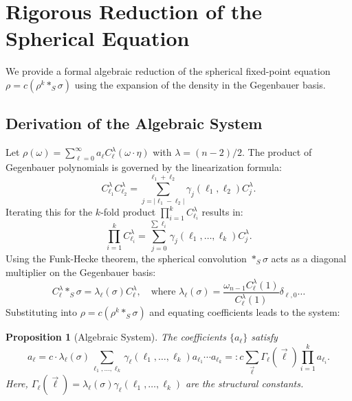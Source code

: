 \documentclass[12pt]{article}
\newtheorem{proposition}[theorem]{Proposition}
\begin{document}
\section{Rigorous Reduction of the Spherical Equation}

We provide a formal algebraic reduction of the spherical fixed-point equation
$\rho = c (\rho^k \ast_S \sigma)$ using the expansion of the density in the 
Gegenbauer basis.

\subsection{Derivation of the Algebraic System}
Let $\rho(\omega) = \sum_{\ell=0}^\infty a_\ell C_\ell^\lambda(\omega \cdot \eta)$ with $\lambda = (n-2)/2$.
The product of Gegenbauer polynomials is governed by the linearization formula:
\[
  C_{\ell_1}^\lambda C_{\ell_2}^\lambda = \sum_{j=|\ell_1-\ell_2|}^{\ell_1+\ell_2} \gamma_j(\ell_1, \ell_2) C_j^\lambda.
\]
Iterating this for the $k$-fold product $\prod_{i=1}^k C_{\ell_i}^\lambda$ results in:
\[
  \prod_{i=1}^k C_{\ell_i}^\lambda = \sum_{j=0}^{\sum \ell_i} \gamma_j(\ell_1, \dots, \ell_k) C_j^\lambda.
\]
Using the Funk-Hecke theorem, the spherical convolution $\ast_S \sigma$ acts as a diagonal multiplier on the Gegenbauer basis:
\[
  C_\ell^\lambda \ast_S \sigma = \lambda_\ell(\sigma) C_\ell^\lambda, \quad \text{where } \lambda_\ell(\sigma) = \frac{\omega_{n-1} C_\ell^\lambda(1)}{C_\ell^\lambda(1)} \delta_{\ell,0} \dots
\]
Substituting into $\rho = c (\rho^k \ast_S \sigma)$ and equating coefficients leads to the system:
\begin{proposition}[Algebraic System]
  The coefficients $\{a_\ell\}$ satisfy
  \[
    a_\ell = c \cdot \lambda_\ell(\sigma) \sum_{\ell_1, \dots, \ell_k} \gamma_\ell(\ell_1, \dots, \ell_k) a_{\ell_1} \cdots a_{\ell_k} =: c \sum_{\vec{\ell}} \Gamma_\ell(\vec{\ell}) \prod_{i=1}^k a_{\ell_i}.
  \]
  Here, $\Gamma_\ell(\vec{\ell}) = \lambda_\ell(\sigma) \gamma_\ell(\ell_1, \dots, \ell_k)$ are the structural constants.
\end{proposition}
\end{document}
